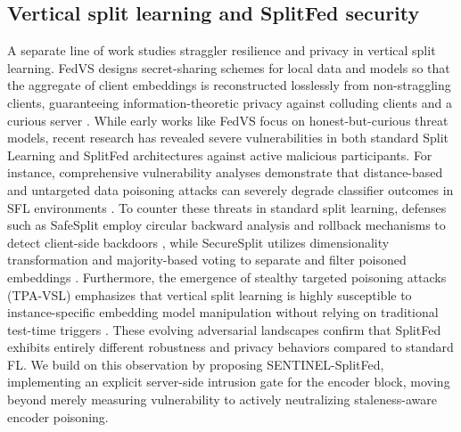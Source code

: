 \documentclass[pdflatex,sn-mathphys-num]{sn-jnl}
\begin{document}
\subsection{Vertical split learning and SplitFed security}

A separate line of work studies straggler resilience and privacy in vertical split learning. FedVS designs secret-sharing schemes for local data and models so that the aggregate of client embeddings is reconstructed losslessly from non-straggling clients, guaranteeing information-theoretic privacy against colluding clients and a curious server \cite{li2023fedvs}. While early works like FedVS focus on honest-but-curious threat models, recent research has revealed severe vulnerabilities in both standard Split Learning and SplitFed architectures against active malicious participants. For instance, comprehensive vulnerability analyses demonstrate that distance-based and untargeted data poisoning attacks can severely degrade classifier outcomes in SFL environments \cite{alferaidi2025analyzing}. To counter these threats in standard split learning, defenses such as SafeSplit employ circular backward analysis and rollback mechanisms to detect client-side backdoors \cite{safesplit2025}, while SecureSplit utilizes dimensionality transformation and majority-based voting to separate and filter poisoned embeddings \cite{dou2026securesplit}. Furthermore, the emergence of stealthy targeted poisoning attacks (TPA-VSL) emphasizes that vertical split learning is highly susceptible to instance-specific embedding model manipulation without relying on traditional test-time triggers \cite{tpavsl2026}. These evolving adversarial landscapes confirm that SplitFed exhibits entirely different robustness and privacy behaviors compared to standard FL. We build on this observation by proposing SENTINEL-SplitFed, implementing an explicit server-side intrusion gate for the encoder block, moving beyond merely measuring vulnerability to actively neutralizing staleness-aware encoder poisoning.
\end{document}

